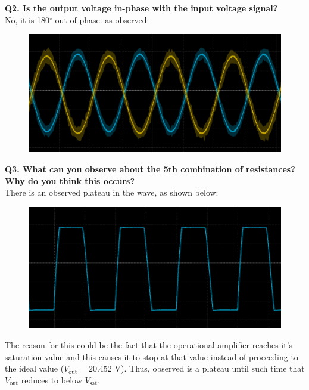 \documentclass[a4paper,12pt,oneside, tikz]{book}
\begin{document}
\begin{tcolorbox}
\textbf{Q2. Is the output voltage in-phase with the input voltage signal?} \\
No, it is 180${}^\circ$ out of phase. as observed:
\begin{figure}[H]
    \centering
    \includegraphics[width=120mm]{./images/out_phase.png}
\end{figure}

\end{tcolorbox}\begin{tcolorbox}
\textbf{Q3. What can you observe about the 5th combination of resistances? Why do you think this occurs?} \\
There is an observed plateau in the wave, as shown below:
\begin{figure}[H]
    \centering
    \includegraphics[width=120mm]{./images/plateau2.png}
\end{figure}

The reason for this could be the fact that the operational amplifier reaches it's saturation value and this causes it to stop at that value instead of proceeding to the ideal value ($V_\text{out} = 20.452$ V). Thus, observed is a plateau until such time that $V_\text{out}$ reduces to below $V_\text{sat}$.

\end{tcolorbox}
\end{document}
